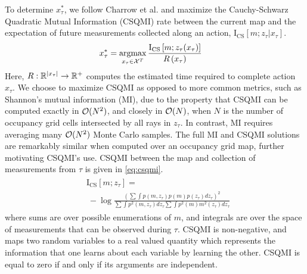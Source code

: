 To determine $x_{\tau}^{*}$, we follow Charrow et al. \cite{charrow15} and maximize the
Cauchy-Schwarz Quadratic Mutual Information (CSQMI) rate between the current map and the
expectation of future measurements collected along an action, $\text{I}_{\text{CS}}[m; z_{\tau} \vert
x_{\tau}]$.
%
\begin{align}
  \begin{split}
    x_{\tau}^{*}
    &=
    \argmax_{x_{\tau} \in \mc{X}^{T}}
    \frac{\text{I}_{\text{CS}}
      \left[
        m
        ;
        z_{\tau}(x_{\tau})
      \right]
    }
    {R\left(x_{\tau}\right)}
    \label{eq:mutual_information}
  \end{split}
\end{align}
%
Here, $R : {\mathbb{R}}^{\vert x_{\tau} \vert} \rightarrow {\mathbb{R}}^{+}$ computes the
estimated time required to complete action $x_{\tau}$. We choose to maximize
CSQMI as opposed to more common metrics, such as Shannon's mutual information
(MI), due to the property that CSQMI can be computed exactly
in $\mathcal{O}(N^{2})$, and closely in $\mathcal{O}(N)$, when $N$ is the number of occupancy
grid cells intersected by all rays in $z_{\tau}$. In contrast,
MI requires averaging many $\mathcal{O}(N^{2})$ Monte Carlo
samples. The full MI and CSQMI solutions are remarkably similar when computed
over an occupancy grid map, further motivating CSQMI's use. CSQMI between the
map and collection of measurements from $\tau$ is given in \eqref{eq:csqmi}.
%
\begin{align}
  \begin{split}
    &\text{I}_{\text{CS}}
    \left[
      m;
      z_{\tau}
    \right]
    = \\
    &\ -\log
    \frac
    {
      (
      \sum
      \int
      p(m, z_{\tau})
      p(m)
      p(z_{\tau})
      dz_{\tau}
      )^{2}
    }
    {
      \sum
      \int
      p^{2}(m, z_{\tau})
      dz_{\tau}
      \sum
      \int
      p^{2}(m)
      m^{2}(z_{\tau})dz_{\tau}
    }
    \label{eq:csqmi}
  \end{split}
\end{align}
%
where sums are over possible enumerations of $m$, and integrals are over the
space of measurements that can be observed during $\tau$. CSQMI is non-negative,
and maps two random variables to a real valued quantity
which represents the information that one learns about each variable by learning
the other. CSQMI is equal to zero if and only if its arguments are independent.

